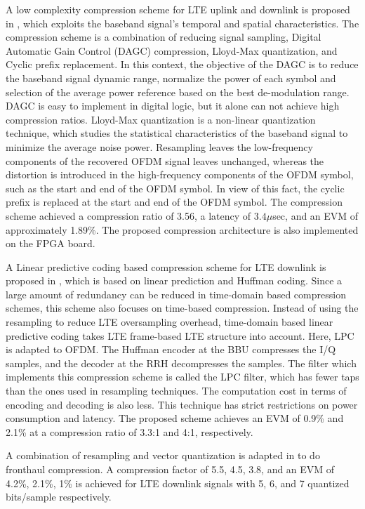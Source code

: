 \begin{multicols}{2}
\begin{itemize}
A low complexity compression scheme for LTE uplink and downlink is proposed in \cite{art3-key70}, which exploits the baseband signal’s temporal and spatial characteristics. The compression scheme is a combination of reducing signal sampling, Digital Automatic Gain Control (DAGC) compression, Lloyd-Max quantization, and Cyclic prefix replacement. In this context, the objective of the DAGC is to reduce the baseband signal dynamic range, normalize the power of each symbol and selection of the average power reference based on the best de-modulation range. DAGC is easy to implement in digital logic, but it alone can not achieve high compression ratios. Lloyd-Max quantization is a non-linear quantization technique, which studies the statistical characteristics of the baseband signal to minimize the average noise power. Resampling leaves the low-frequency components of the recovered OFDM signal leaves unchanged, whereas the distortion is introduced in the high-frequency components of the OFDM symbol, such as the start and end of the OFDM symbol. In view of this fact, the cyclic prefix is replaced at the start and end of the OFDM symbol. The compression scheme achieved a compression ratio of 3.56, a latency of $3.4 \mu$sec, and an EVM of approximately 1.89\%. The proposed compression architecture is also implemented on the FPGA board. 

A Linear predictive coding based compression scheme for LTE downlink is proposed in \cite{art3-key71}, which is based on linear prediction and Huffman coding. Since a large amount of redundancy can be reduced in time-domain based compression schemes, this scheme also focuses on time-based compression. Instead of using the resampling to reduce LTE oversampling overhead, time-domain based linear predictive coding takes LTE frame-based LTE structure into account. Here, LPC is adapted to OFDM. The Huffman encoder at the BBU compresses the I/Q samples, and the decoder at the RRH decompresses the samples. The filter which implements this compression scheme is called the LPC filter, which has fewer taps than the ones used in resampling techniques. The computation cost in terms of encoding and decoding is also less. This technique has strict restrictions on power consumption and latency. The proposed scheme achieves an EVM of 0.9\% and 2.1\% at a compression ratio of 3.3:1 and 4:1, respectively. 

A combination of resampling and vector quantization is adapted in \cite{art3-key72} to do fronthaul compression. A compression factor of 5.5, 4.5, 3.8, and an EVM of 4.2\%, 2.1\%, 1\% is achieved for LTE downlink signals with 5, 6, and 7 quantized bits/sample respectively.


\end{itemize}
\end{multicols}
